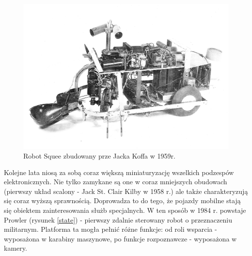   \begin{figure}[H]
    \begin{center}
      \includegraphics[scale=0.35]{imgs/Squee.jpg}
 \caption[Robot \textit{Squee}]{\small{Robot Squee zbudowany prze Jacka Koffa w 1959r.}\footnotemark}
        \label{squee}
    \end{center}
  \end{figure}

Kolejne lata niosą za sobą coraz większą miniaturyzację wszelkich podzespów elektronicznych. Nie tylko zamykane są one w coraz mniejszych obudowach (pierwszy układ scalony - Jack St. Clair Kilby w 1958 r.) ale także charakteryzują się coraz wyższą sprawnością. Doprowadza to do tego, że pojazdy mobilne stają się obiektem zainteresowania służb specjalnych. W ten sposób w 1984 r. powstaje Prowler (rysunek \ref{state}) - pierwszy zdalnie sterowany robot o przeznaczeniu militarnym. Platforma ta mogła pełnić różne funkcje: od roli wsparcia - wyposażona w karabiny maszynowe, po funkcje rozpoznawcze - wyposażona w kamery.

